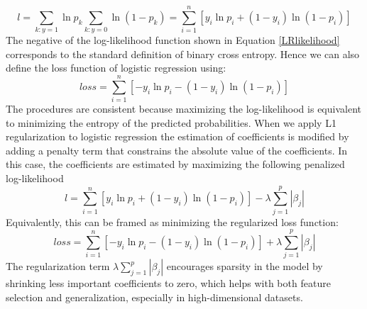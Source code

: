 \begin{equation}
l=\sum_{k:y=1}\ln p_k\sum_{k:y=0}\ln(1-p_k)=\sum_{i=1}^n [y_i\ln p_i+(1-y_i)\ln(1-p_i)]
\label{LRlikelihood}
\end{equation}
The negative of the log-likelihood function shown in Equation \eqref{LRlikelihood} corresponds to the standard definition of binary cross entropy. Hence we can also define the loss function of logistic regression using:\\
\begin{equation}
loss=\sum_{i=1}^n [-y_i\ln p_i-(1-y_i)\ln(1-p_i)]
\end{equation}
The procedures are consistent because maximizing the log-likelihood is equivalent to minimizing the entropy of the predicted probabilities. When we apply L1 regularization to logistic regression the estimation of coefficients is modified by adding a penalty term that constrains the absolute value of the coefficients. In this case, the coefficients are estimated by maximizing the following penalized log-likelihood\\
\begin{equation}
	l=\sum_{i=1}^n [y_i\ln p_i+(1-y_i)\ln(1-p_i)]-\lambda \sum_{j=1}^p |\beta_j|
\end{equation}
Equivalently, this can be framed as minimizing the regularized loss function:
\begin{equation}
	loss=\sum_{i=1}^n [-y_i\ln p_i-(1-y_i)\ln(1-p_i)]+\lambda \sum_{j=1}^p |\beta_j|
\end{equation}
The regularization term $\lambda \sum_{j=1}^p |\beta_j|$ encourages sparsity in the model by shrinking less important coefficients to zero, which helps with both feature selection and generalization, especially in high-dimensional datasets.\\
\\

